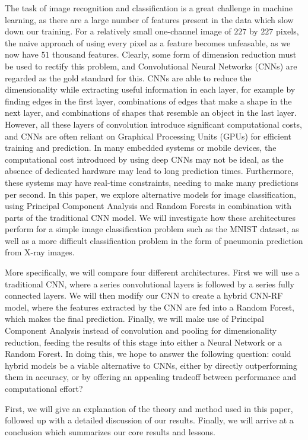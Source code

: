 \documentclass[onecolumn,10pt,cleanfoot]{asme2ej}
\begin{document}
The task of image recognition and classification is a great challenge in machine learning, as there are a large number of features present in the data which slow down our training. For a relatively small one-channel image of $227$ by $227$ pixels, the naive approach of using every pixel as a feature becomes unfeasable, as we now have $51$ thousand features. Clearly, some form of dimension reduction must be used to rectify this problem, and Convolutional Neural Networks (CNNs) are regarded as the gold standard for this. CNNs are able to reduce the dimensionality while extracting useful information in each layer, for example by finding edges in the first layer, combinations of edges that make a shape in the next layer, and combinations of shapes that resemble an object in the last layer. However, all these layers of convolution introduce significant computational costs, and CNNs are often reliant on Graphical Processing Units (GPUs) for efficient training and prediction. In many embedded systems or mobile devices, the computational cost introduced by using deep CNNs may not be ideal, as the absence of dedicated hardware may lead to long prediction times. Furthermore, these systems may have real-time constraints, needing to make many predictions per second. In this paper, we explore alternative models for image classification, using Principal Component Analysis and Random Forests in combination with parts of the traditional CNN model. We will investigate how these architectures perform for a simple image classification problem such as the MNIST dataset, as well as a more difficult classification problem in the form of pneumonia prediction from X-ray images. 

More specifically, we will compare four different architectures. First we will use a traditional CNN, where a series convolutional layers is followed by a series fully connected layers. We will then modify our CNN to create a hybrid CNN-RF model, where the features extracted by the CNN are fed into a Random Forest, which makes the final prediction. Finally, we will make use of Principal Component Analysis instead of convolution and pooling for dimensionality reduction, feeding the results of this stage into either a Neural Network or a Random Forest. In doing this, we hope to answer the following question: could hybrid models be a viable alternative to CNNs, either by directly outperforming them in accuracy, or by offering an appealing tradeoff between performance and computational effort?

First, we will give an explanation of the theory and method used in this paper, followed up with a detailed discussion of our results. Finally, we will arrive at a conclusion which summarizes our core results and lessons.
\end{document}
